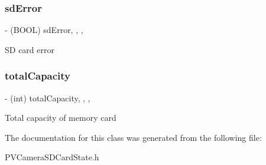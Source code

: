 \subsubsection{\texorpdfstring{sd\+Error}{sdError}}
{\footnotesize\ttfamily -\/ (B\+O\+OL) sd\+Error\hspace{0.3cm}{\ttfamily [read]}, {\ttfamily [write]}, {\ttfamily [nonatomic]}, {\ttfamily [assign]}}

SD card error \mbox{\label{interface_p_v_camera_s_d_card_state_a9cc5c54d277c7d8e09a1a9905bb2228e}} 
\subsubsection{\texorpdfstring{total\+Capacity}{totalCapacity}}
{\footnotesize\ttfamily -\/ (int) total\+Capacity\hspace{0.3cm}{\ttfamily [read]}, {\ttfamily [write]}, {\ttfamily [nonatomic]}, {\ttfamily [assign]}}

Total capacity of memory card 

The documentation for this class was generated from the following file\+:\begin{DoxyCompactItemize}
\item 
P\+V\+Camera\+S\+D\+Card\+State.\+h\end{DoxyCompactItemize}
